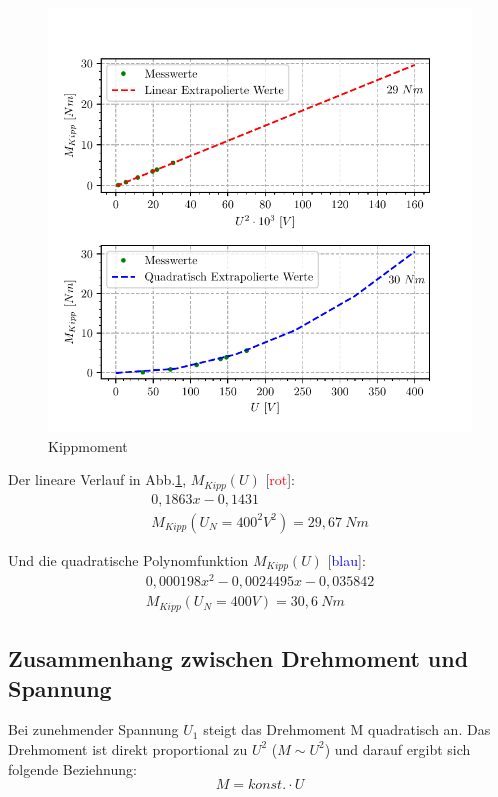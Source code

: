 \documentclass[conference]{IEEEtran}
\begin{document}
\vspace{-7ex}
\begin{figure}[htbp]
    \centering
    \includegraphics[width=\columnwidth]{./kippmoment.pdf}
    \caption{Kippmoment}
    \label{fig:Kippmoment}
\end{figure}

Der lineare Verlauf in Abb.\ref{fig:Kippmoment}, $M_{\textit{Kipp}}(U)$ [\textcolor{red}{rot}]:
\begin{gather*}
    0,1863 x - 0,1431\\
    M_{Kipp}(U_N=400^2V^2)=29,67 \ Nm
\end{gather*}

Und die quadratische Polynomfunktion $M_{\textit{Kipp}}(U)$ [\textcolor{blue}{blau}]:
\begin{gather*}
    0,000198 x^2 - 0,0024495 x -0,035842\\
    M_{Kipp}(U_N=400V)=30,6\ Nm
\end{gather*}



\subsection{Zusammenhang zwischen Drehmoment und Spannung}

Bei zunehmender Spannung $U_1$ steigt das Drehmoment M quadratisch an. Das
Drehmoment ist direkt proportional zu $U^2$ ($M \sim U^2$) und darauf ergibt sich
folgende Beziehnung: \[ M = \textit{konst.} \cdot U \]
\end{document}
